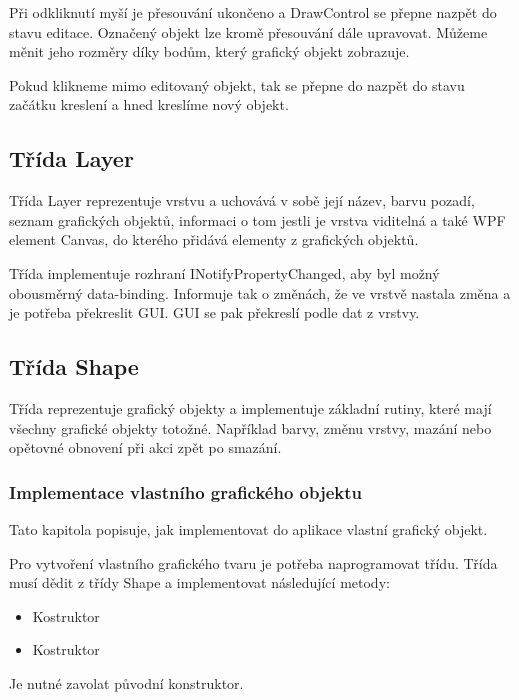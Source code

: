 \documentclass[
  field=inf,
  biblatex,
  glossaries,
  index
]{kidiplom}
\begin{document}
Při odkliknutí myší je přesouvání ukončeno a DrawControl se přepne nazpět do stavu editace. Označený objekt lze kromě přesouvání dále upravovat. Můžeme měnit jeho rozměry díky bodům, který grafický objekt zobrazuje.

Pokud klikneme mimo editovaný objekt, tak se přepne do nazpět do stavu začátku kreslení a hned kreslíme nový objekt.

\subsection{Třída Layer}

Třída Layer reprezentuje vrstvu a uchovává v sobě její název, barvu pozadí, seznam grafických objektů, informaci o tom jestli je vrstva viditelná a také WPF element Canvas, do kterého přidává elementy z grafických objektů. 

Třída implementuje rozhraní INotifyPropertyChanged, aby byl možný obousměrný data-binding. Informuje tak o změnách, že ve vrstvě nastala změna a je potřeba překreslit GUI. GUI se pak překreslí podle dat z vrstvy.

\subsection{Třída Shape}

Třída reprezentuje grafický objekty a implementuje základní rutiny, které mají všechny grafické objekty totožné. Například barvy, změnu vrstvy, mazání nebo opětovné obnovení při akci zpět po smazání.

\subsubsection{Implementace vlastního grafického objektu}

Tato kapitola popisuje, jak implementovat do aplikace vlastní grafický objekt.

Pro vytvoření vlastního grafického tvaru je potřeba naprogramovat třídu. Třída musí dědit z třídy Shape a implementovat následující metody:

\begin{itemize}
\item Kostruktor 
\item Kostruktor 
\end{itemize}
Je nutné zavolat původní konstruktor.
\end{document}
